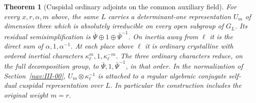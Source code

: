 \documentclass[a4paper,11pt]{article}
\newtheorem{theorem}[proposition]{Theorem}
\theoremstyle{definition}
\theoremstyle{remark}
\numberwithin{equation}{section}
\begin{document}
\begin{theorem}[Cuspidal ordinary adjoints on the common auxiliary field]
\label{thm:adjointseed361}
For every \(x,r,\alpha,m\) above, the same \(L\) carries a
determinant-one representation \(U_m\) of dimension three which
is absolutely irreducible on every open subgroup of \(G_L\).
Its residual semisimplification is
\(\bar\Psi\oplus1\oplus\bar\Psi^{-1}\).
On inertia away from \(\ell\) it is the direct sum of
\(\alpha,1,\alpha^{-1}\).
At each place above \(\ell\) it is ordinary crystalline with ordered
inertial characters \(\kappa_\ell^m,1,\kappa_\ell^{-m}\).
The three ordinary characters reduce, on the full decomposition
group, to \(\bar\Psi,1,\bar\Psi^{-1}\), in that order.
In the normalization of Section~\ref{nav:III-00},
\(U_m\otimes\kappa_\ell^{-1}\) is attached to a regular algebraic
conjugate self-dual cuspidal representation over \(L\).
In particular the construction includes the original weight \(m=r\).
\end{theorem}
\end{document}
